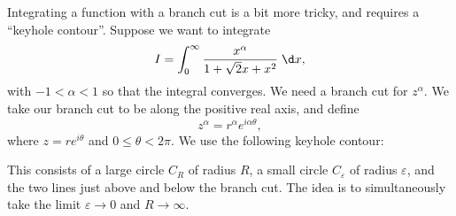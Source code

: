 \documentclass[a4paper]{article}
\begin{document}
\begin{eg}
  Integrating a function with a branch cut is a bit more tricky, and requires a ``keyhole contour''. Suppose we want to integrate
  \[
    I = \int_0^\infty \frac{x^\alpha}{1 + \sqrt{2}x + x^2}\;\d x,
  \]
  with $-1 < \alpha < 1$ so that the integral converges. We need a branch cut for $z^{\alpha}$. We take our branch cut to be along the positive real axis, and define
  \[
    z^\alpha = r^\alpha e^{i\alpha \theta},
  \]
  where $z = re^{i\theta}$ and $0 \leq \theta < 2\pi$. We use the following keyhole contour:
  \begin{center}
  \end{center}
  This consists of a large circle $C_R$ of radius $R$, a small circle $C_\varepsilon$ of radius $\varepsilon$, and the two lines just above and below the branch cut. The idea is to simultaneously take the limit $\varepsilon \to 0$ and $R \to \infty$.


\end{eg}
\end{document}
